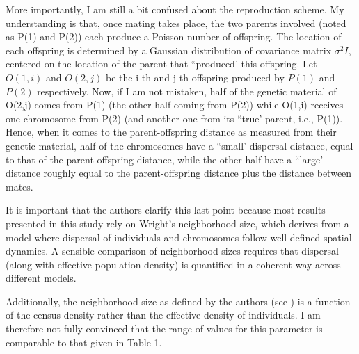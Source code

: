 
\begin{point}{}
More importantly, I am still a bit confused about the reproduction scheme. My understanding is that, once mating takes place, the two parents involved (noted as P(1) and P(2)) each produce a Poisson number of offspring. The location of each offspring is determined by a Gaussian distribution of covariance matrix $\sigma^2 I$, centered on the location of the parent that ``produced' this offspring. Let $O(1,i)$ and $O(2,j)$ be the i-th and j-th offspring produced by $P(1)$ and $P(2)$ respectively. Now, if I am not mistaken, half of the genetic material of O(2,j) comes from P(1) (the other half coming from P(2)) while O(1,i) receives one chromosome from P(2) (and another one from its ``true' parent, i.e., P(1)). Hence, when it comes to the parent-offspring distance as measured from their genetic material, half of the chromosomes have a ``small' dispersal distance, equal to that of the parent-offspring distance, while the other half have a ``large' distance roughly equal to the parent-offspring distance plus the distance between mates.

It is important that the authors clarify this last point because most results presented in this study rely on Wright's neighborhood size, which derives from a model where dispersal of individuals and chromosomes follow well-defined spatial dynamics. A sensible comparison of neighborhood sizes requires that dispersal (along with effective population density) is quantified in a coherent way across different models.

Additionally, the neighborhood size as defined by the authors (see ) is a function of the census density rather than the effective density of individuals. I am therefore not fully convinced that the range of values for this parameter is comparable to that given in Table 1.
\end{point}

